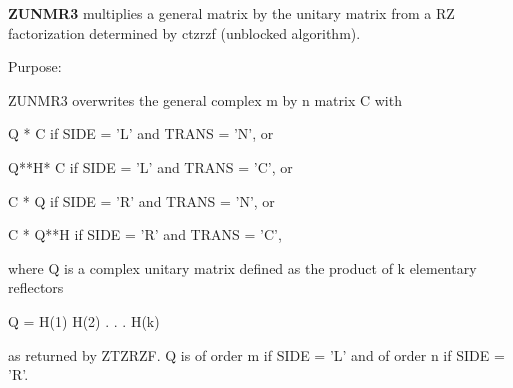 {\bfseries Z\+U\+N\+M\+R3} multiplies a general matrix by the unitary matrix from a R\+Z factorization determined by ctzrzf (unblocked algorithm). 

 \begin{DoxyParagraph}{Purpose\+: }
\begin{DoxyVerb} ZUNMR3 overwrites the general complex m by n matrix C with

       Q * C  if SIDE = 'L' and TRANS = 'N', or

       Q**H* C  if SIDE = 'L' and TRANS = 'C', or

       C * Q  if SIDE = 'R' and TRANS = 'N', or

       C * Q**H if SIDE = 'R' and TRANS = 'C',

 where Q is a complex unitary matrix defined as the product of k
 elementary reflectors

       Q = H(1) H(2) . . . H(k)

 as returned by ZTZRZF. Q is of order m if SIDE = 'L' and of order n
 if SIDE = 'R'.\end{DoxyVerb}
 
\end{DoxyParagraph}

